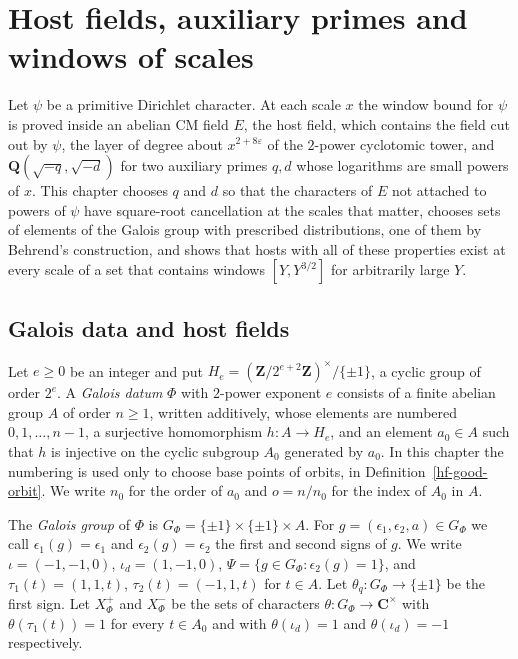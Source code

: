 \chapter{Host fields, auxiliary primes and windows of scales}\label{chapter-host-fields}

Let $\psi$ be a primitive Dirichlet character. At each scale $x$ the window bound for $\psi$ is
proved inside an abelian CM field $E$, the host field, which contains the field cut out by $\psi$,
the layer of degree about $x^{2+8\varepsilon}$ of the $2$-power cyclotomic tower, and
$\mathbf Q(\sqrt{-q},\sqrt{-d})$ for two auxiliary primes $q,d$ whose logarithms are small powers of
$x$.
This chapter chooses $q$ and $d$ so that the characters of $E$ not attached to powers of $\psi$ have
square-root cancellation at the scales that matter, chooses sets of elements of the Galois group
with prescribed distributions, one of them by Behrend's construction, and shows that hosts with all
of these properties exist at every scale of a set that contains windows $[Y,Y^{3/2}]$ for
arbitrarily large $Y$.

\section{Galois data and host fields}\label{section-hf-host-fields}

\begin{definition}\label{hf-frame}
Let $e\geq0$ be an integer and put $H_e=(\mathbf Z/2^{e+2}\mathbf Z)^\times/\{\pm1\}$, a cyclic
group of order $2^e$. A \emph{Galois datum} $\Phi$ with $2$-power exponent $e$ consists of a finite abelian
group $A$ of order $n\geq1$, written additively, whose elements are numbered $0,1,\ldots,n-1$, a
surjective homomorphism $h\colon A\to H_e$, and an element $a_0\in A$ such that $h$ is injective on
the cyclic subgroup $A_0$ generated by $a_0$. In this chapter the numbering is used only to choose
base points of orbits, in Definition~\ref{hf-good-orbit}.
We write $n_0$ for the order of $a_0$ and $o=n/n_0$ for the index of $A_0$ in $A$.

The \emph{Galois group} of $\Phi$ is $G_\Phi=\{\pm1\}\times\{\pm1\}\times A$. For
$g=(\epsilon_1,\epsilon_2,a)\in G_\Phi$ we call $\epsilon_1(g)=\epsilon_1$ and
$\epsilon_2(g)=\epsilon_2$ the first and second signs of $g$. We write $\iota=(-1,-1,0)$,
$\iota_d=(1,-1,0)$, $\Psi=\{g\in G_\Phi:\epsilon_2(g)=1\}$, and $\tau_1(t)=(1,1,t)$,
$\tau_2(t)=(-1,1,t)$ for $t\in A$. Let $\theta_q\colon G_\Phi\to\{\pm1\}$ be the first sign. Let
$X^+_\Phi$ and $X^-_\Phi$ be the sets of characters $\theta\colon G_\Phi\to\mathbf C^\times$ with
$\theta(\tau_1(t))=1$ for every $t\in A_0$ and with $\theta(\iota_d)=1$ and $\theta(\iota_d)=-1$
respectively.
\end{definition}

